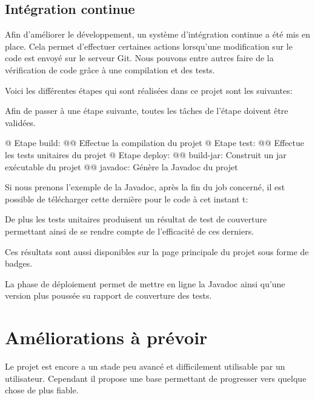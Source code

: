 \documentclass[final, noposter]{polytech/polytech}
\begin{document}
	\section{Intégration continue} 
		Afin d'améliorer le développement, un système d'intégration continue a été mis en place.
	Cela permet d'effectuer certaines actions lorsqu'une modification sur le code est envoyé sur le serveur Git.
	Nous pouvons entre autres faire de la vérification de code grâce à une compilation et des tests.
	
	Voici les différentes étapes qui sont réalisées dans ce projet sont les suivantes:
	
	Afin de passer à une étape suivante, toutes les tâches de l'étape doivent être validées.
		
	\begin{easylist}[itemize]
		@ Etape build:
		@@ Effectue la compilation du projet
		@ Etape test:
		@@ Effectue les tests unitaires du projet
		@ Etape deploy:
		@@ build-jar: Construit un jar exécutable du projet
		@@ javadoc: Génère la Javadoc du projet
	\end{easylist}
	
	Si nous prenons l'exemple de la Javadoc, après la fin du job concerné, il est possible de télécharger cette dernière pour le code à cet instant t:
	
	De plus les tests unitaires produisent un résultat de test de couverture permettant ainsi de se rendre compte de l'efficacité de ces derniers. 
	
	Ces résultats sont aussi disponibles sur la page principale du projet sous forme de badges.
	
	La phase de déploiement permet de mettre en ligne la Javadoc ainsi qu'une version plus poussée su rapport de couverture des tests.

\chapter{Améliorations à prévoir}
	Le projet est encore a un stade peu avancé et difficilement utilisable par un utilisateur.
	Cependant il propose une base permettant de progresser vers quelque chose de plus fiable.
	
\end{document}
